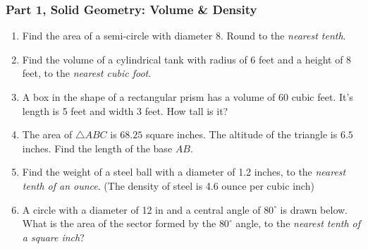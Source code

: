 \documentclass[12pt, twoside]{article}
\begin{document}
\subsubsection*{Part 1, Solid Geometry: Volume \& Density}
 \begin{enumerate}

  \item Find the area of a semi-circle with diameter 8. Round to the \emph{nearest tenth}.\vspace{3cm}

  \item Find the volume of a cylindrical tank with radius of $6$ feet and a height of 8 feet, to the \emph{nearest cubic foot}. \vspace{2.5cm}

  \item A box in the shape of a rectangular prism has a volume of 60 cubic feet. It's length is 5 feet and width 3 feet. How tall is it? \vspace{3.0cm}

  \item The area of $\triangle ABC$ is $68.25$ square inches. The altitude of the triangle is $6.5$ inches. Find the length of the base $AB$.\\[0.5cm]
   \vspace{0.25cm}

  \item Find the weight of a steel ball with a diameter of 1.2 inches, to the \emph{nearest tenth of an ounce}. (The density of steel is 4.6 ounce per cubic inch)

\newpage

  \item A circle with a diameter of 12 in and a central angle of $80^\circ$ is drawn below. What is the area of the sector formed by the $80^\circ$ angle, to the \emph{nearest tenth of a square inch}?\\[0.25cm]
   \vspace{0.5cm}


\end{enumerate}
\end{document}
